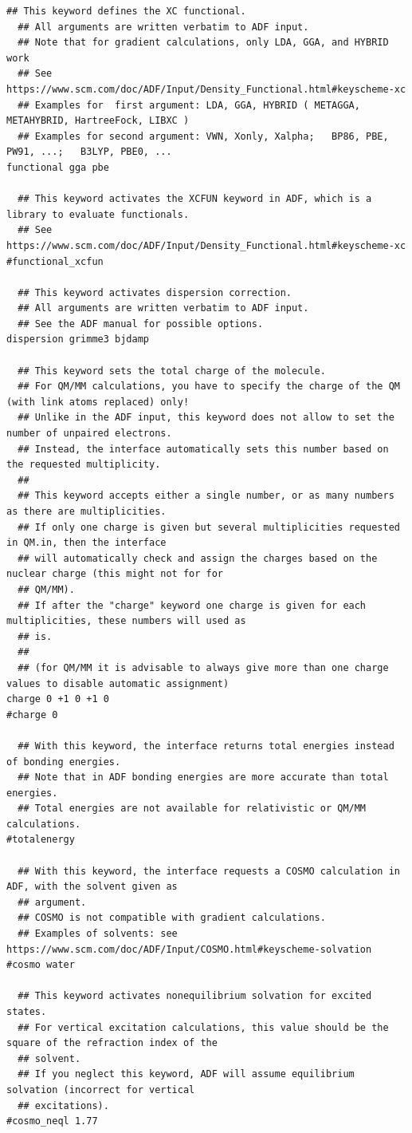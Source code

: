 \documentclass[a4paper,11pt,DIV=15,openany]{scrbook}
\begin{document}
\begin{oframed}
\begin{Verbatim}[commandchars=\\\{\}]
  ## This keyword defines the XC functional.
  ## All arguments are written verbatim to ADF input.
  ## Note that for gradient calculations, only LDA, GGA, and HYBRID work
  ## See https://www.scm.com/doc/ADF/Input/Density_Functional.html#keyscheme-xc
  ## Examples for  first argument: LDA, GGA, HYBRID ( METAGGA, METAHYBRID, HartreeFock, LIBXC )
  ## Examples for second argument: VWN, Xonly, Xalpha;   BP86, PBE, PW91, ...;   B3LYP, PBE0, ...
functional gga pbe

  ## This keyword activates the XCFUN keyword in ADF, which is a library to evaluate functionals.
  ## See https://www.scm.com/doc/ADF/Input/Density_Functional.html#keyscheme-xc
#functional_xcfun

  ## This keyword activates dispersion correction.
  ## All arguments are written verbatim to ADF input.
  ## See the ADF manual for possible options.
dispersion grimme3 bjdamp

  ## This keyword sets the total charge of the molecule.
  ## For QM/MM calculations, you have to specify the charge of the QM (with link atoms replaced) only!
  ## Unlike in the ADF input, this keyword does not allow to set the number of unpaired electrons.
  ## Instead, the interface automatically sets this number based on the requested multiplicity.
  ##
  ## This keyword accepts either a single number, or as many numbers as there are multiplicities.
  ## If only one charge is given but several multiplicities requested in QM.in, then the interface
  ## will automatically check and assign the charges based on the nuclear charge (this might not for for 
  ## QM/MM).
  ## If after the "charge" keyword one charge is given for each multiplicities, these numbers will used as 
  ## is.
  ## 
  ## (for QM/MM it is advisable to always give more than one charge values to disable automatic assignment)
charge 0 +1 0 +1 0
#charge 0

  ## With this keyword, the interface returns total energies instead of bonding energies.
  ## Note that in ADF bonding energies are more accurate than total energies.
  ## Total energies are not available for relativistic or QM/MM calculations.
#totalenergy

  ## With this keyword, the interface requests a COSMO calculation in ADF, with the solvent given as 
  ## argument.
  ## COSMO is not compatible with gradient calculations.
  ## Examples of solvents: see https://www.scm.com/doc/ADF/Input/COSMO.html#keyscheme-solvation
#cosmo water

  ## This keyword activates nonequilibrium solvation for excited states.
  ## For vertical excitation calculations, this value should be the square of the refraction index of the 
  ## solvent.
  ## If you neglect this keyword, ADF will assume equilibrium solvation (incorrect for vertical 
  ## excitations).
#cosmo_neql 1.77


\end{Verbatim}
\end{oframed}
\end{document}
